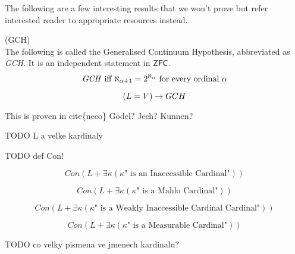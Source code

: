 The following are a few interesting results that we won't prove but refer interested reader to appropriate resources instead.

\begin{definition}{(GCH)}\\
The following is called the Generalised Continuum Hypothesis, abbreviated as \emph{GCH}. It is an independent statement in $\sf{ZFC}$.
\begin{equation}
\mbox{\emph{GCH} iff }\aleph_{\alpha+1}=2^{\aleph_\alpha} \mbox{ for every ordinal }\alpha
\end{equation}
\end{definition}

\begin{theorem}
\begin{equation}
(L = V) \rightarrow GCH
\end{equation}
\end{theorem}

This is proven in cite\{neco\} Gödel? Jech? Kunnen?



TODO L a velke kardinaly


TODO def Con!
\begin{theorem}
\begin{equation}
Con(L + \exists \kappa (\kappa \mbox{" is an Inaccessible Cardinal"}))  
\end{equation}
\end{theorem}

\begin{theorem}
\begin{equation}
Con(L + \exists \kappa (\kappa \mbox{" is a Mahlo Cardinal"}))  
\end{equation}
\end{theorem}


\begin{theorem}
\begin{equation}
Con(L + \exists \kappa (\kappa \mbox{" is a Weakly Inaccessible Cardinal Cardinal"}))  
\end{equation}
\end{theorem}

\begin{theorem}
\begin{equation}
Con(L + \exists \kappa (\kappa \mbox{" is a Measurable Cardinal"}))  
\end{equation}
\end{theorem}

TODO co velky pismena ve jmenech kardinalu?

